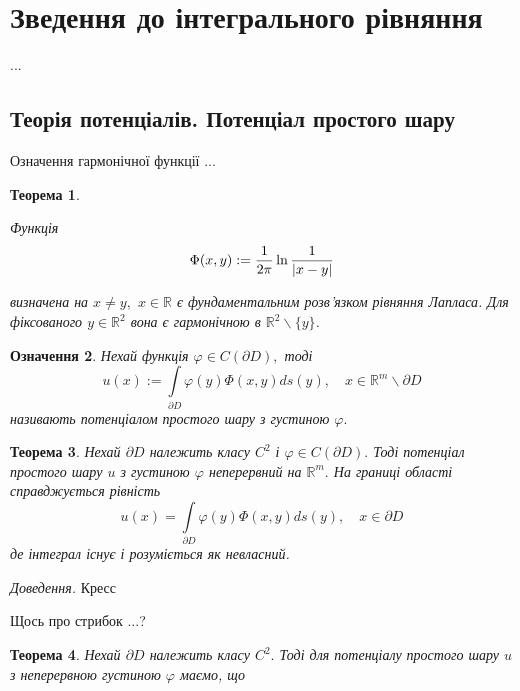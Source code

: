 \documentclass[14pt,a4paper]{extarticle}
\newcounter{e}
\newtheorem{theorem}{Теорема}[section]
\newtheorem{defn}[theorem]{Означення}
\newcommand{\proof}{\textit{Доведення. \space}}
\numberwithin{equation}{section}
\newcommand{\intl}{\int\limits}
\begin{document}
 \newpage
 \thispagestyle{empty}
 \section{Зведення до інтегрального рівняння}
 ...
 \subsection{Теорія потенціалів. Потенціал простого шару}


 
 \hspace{0.5cm} Означення гармонічної функції ...
 
 
 \begin{theorem}
\label{fundamental-solution-theorem}

Функція
\begin{equation}
	\label{fundamental-solution}
	\Phi(x, y) := \frac{1}{2\pi} \ln \frac{1}{\abs{x - y}} 
\end{equation}

визначена на  $x \neq y,$ $x \in \mathbb{R}$ є фундаментальним розв'язком рівняння Лапласа. Для фіксованого $y \in \mathbb{R}^2$ вона є гармонічною в $\mathbb{R}^2 \backslash \{y\}$.
\end{theorem}
 
 \begin{defn}
	 \label{single-layer-potential}
	 Нехай функція $\varphi \in C(\partial D),$ тоді
	 \begin{equation}
	 	u(x):=\intl_{\partial D} \varphi(y) \Phi(x, y) d s(y), \quad x \in \mathbb{R}^{m} \backslash \partial D
	 \end{equation}
	 називають потенціалом простого шару з густиною $\varphi .$
 \end{defn}
 
 \begin{theorem}
	 \label{potential-on-bound} 
	 Нехай $\partial D$ належить класу $C^{2}$ і $\varphi \in C(\partial D) .$ Тоді потенціал простого шару $u$ з густиною $\varphi$ неперервний на $\mathbb{R}^{m} .$ На границі області справджується рівність
	 \begin{equation}
		 u(x)=\intl_{\partial D} \varphi(y) \Phi(x, y) d s(y), \quad x \in \partial D
	 \end{equation}
	 де інтеграл існує і розуміється як невласний.
 \end{theorem}
 \proof Кресс
 
 Щось про стрибок ...?
 
 \begin{theorem}
 	\label{potential-partial-derevative}
	 Нехай $\partial D$ належить класу $C^{2} .$ Тоді для потенціалу простого шару $u$ з неперервною густиною $\varphi$ маємо, що
 \end{theorem}
 
\end{document}
